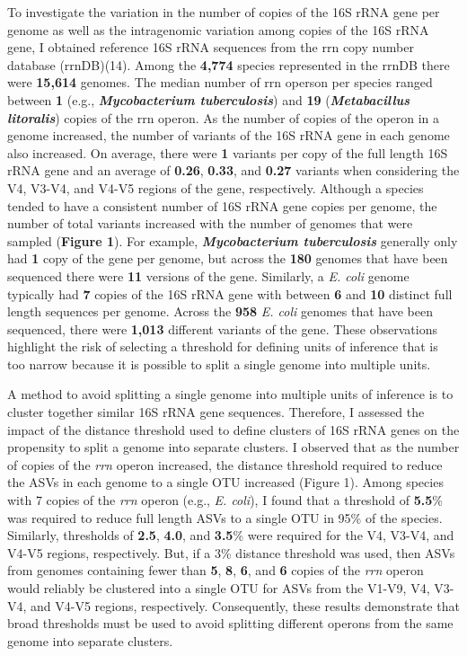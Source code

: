 \documentclass[
]{article}
\begin{document}
To investigate the variation in the number of copies of the 16S rRNA
gene per genome as well as the intragenomic variation among copies of
the 16S rRNA gene, I obtained reference 16S rRNA sequences from the rrn
copy number database (rrnDB)(14). Among the \textbf{4,774} species
represented in the rrnDB there were \textbf{15,614} genomes. The median
number of rrn operson per species ranged between \textbf{1} (e.g.,
\textbf{\emph{Mycobacterium tuberculosis}}) and \textbf{19}
(\textbf{\emph{Metabacillus litoralis}}) copies of the rrn operon. As
the number of copies of the operon in a genome increased, the number of
variants of the 16S rRNA gene in each genome also increased. On average,
there were \textbf{1} variants per copy of the full length 16S rRNA gene
and an average of \textbf{0.26}, \textbf{0.33}, and \textbf{0.27}
variants when considering the V4, V3-V4, and V4-V5 regions of the gene,
respectively. Although a species tended to have a consistent number of
16S rRNA gene copies per genome, the number of total variants increased
with the number of genomes that were sampled (\textbf{Figure 1}). For
example, \textbf{\emph{Mycobacterium tuberculosis}} generally only had
\textbf{1} copy of the gene per genome, but across the \textbf{180}
genomes that have been sequenced there were \textbf{11} versions of the
gene. Similarly, a \emph{E. coli} genome typically had \textbf{7} copies
of the 16S rRNA gene with between \textbf{6} and \textbf{10} distinct
full length sequences per genome. Across the \textbf{958} \emph{E. coli}
genomes that have been sequenced, there were \textbf{1,013} different
variants of the gene. These observations highlight the risk of selecting
a threshold for defining units of inference that is too narrow because
it is possible to split a single genome into multiple units.

A method to avoid splitting a single genome into multiple units of
inference is to cluster together similar 16S rRNA gene sequences.
Therefore, I assessed the impact of the distance threshold used to
define clusters of 16S rRNA genes on the propensity to split a genome
into separate clusters. I observed that as the number of copies of the
\emph{rrn} operon increased, the distance threshold required to reduce
the ASVs in each genome to a single OTU increased (Figure 1). Among
species with 7 copies of the \emph{rrn} operon (e.g., \emph{E. coli}), I
found that a threshold of \textbf{5.5}\% was required to reduce full
length ASVs to a single OTU in 95\% of the species. Similarly,
thresholds of \textbf{2.5}, \textbf{4.0}, and \textbf{3.5}\% were
required for the V4, V3-V4, and V4-V5 regions, respectively. But, if a
3\% distance threshold was used, then ASVs from genomes containing fewer
than \textbf{5}, \textbf{8}, \textbf{6}, and \textbf{6} copies of the
\emph{rrn} operon would reliably be clustered into a single OTU for ASVs
from the V1-V9, V4, V3-V4, and V4-V5 regions, respectively.
Consequently, these results demonstrate that broad thresholds must be
used to avoid splitting different operons from the same genome into
separate clusters.
\end{document}
